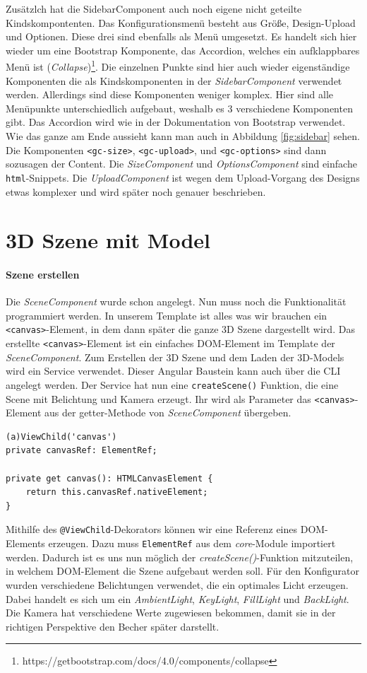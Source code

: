Zusätzlch hat die SidebarComponent auch noch eigene nicht geteilte Kindskompontenten. Das Konfigurationsmenü besteht aus Größe, Design-Upload und Optionen. Diese drei sind ebenfalls als Menü umgesetzt. Es handelt sich hier wieder um eine Bootstrap Komponente, das Accordion, welches ein aufklappbares Menü ist (\textit{Collapse})\footnote{https://getbootstrap.com/docs/4.0/components/collapse}. Die einzelnen Punkte sind hier auch wieder eigenständige Komponenten die als Kindskomponenten in der \textit{SidebarComponent} verwendet werden. Allerdings sind diese Komponenten weniger komplex. Hier sind alle Menüpunkte unterschiedlich aufgebaut, weshalb es 3 verschiedene Komponenten gibt. Das Accordion wird wie in der Dokumentation von Bootstrap verwendet. Wie das ganze am Ende aussieht kann man auch in Abbildung \ref{fig:sidebar} sehen. Die Komponenten \texttt{<gc-size>}, \texttt{<gc-upload>}, und \texttt{<gc-options>} sind dann sozusagen der Content. Die \textit{SizeComponent} und \textit{OptionsComponent} sind einfache \texttt{html}-Snippets. Die \textit{UploadComponent} ist wegen dem Upload-Vorgang des Designs etwas komplexer und wird später noch genauer beschrieben.
%
\section{3D Szene mit Model}
\label{sec:umsetzung}
%
\paragraph{Szene erstellen}Die \textit{SceneComponent} wurde schon angelegt. Nun muss noch die Funktionalität programmiert werden. In unserem Template ist alles was wir brauchen ein \texttt{<canvas>}-Element, in dem dann später die ganze 3D Szene dargestellt wird. Das erstellte \texttt{<canvas>}-Element ist ein einfaches DOM-Element im Template der \textit{SceneComponent}. Zum Erstellen der 3D Szene und dem Laden der 3D-Models wird ein Service verwendet. Dieser Angular Baustein kann auch über die CLI angelegt werden. Der Service hat nun eine \texttt{createScene()} Funktion, die eine Scene mit Belichtung und Kamera erzeugt. Ihr wird als Parameter das \texttt{<canvas>}-Element aus der getter-Methode von \textit{SceneComponent} übergeben. 
%
\begin{lstlisting}[caption={Erstellung eines ElementRef für Canvas},label=lst:elementref]
(a)ViewChild('canvas')
private canvasRef: ElementRef;

private get canvas(): HTMLCanvasElement {
	return this.canvasRef.nativeElement;
}
\end{lstlisting}
%
Mithilfe des \texttt{@ViewChild}-Dekorators können wir eine Referenz eines DOM-Elements erzeugen. Dazu muss \texttt{ElementRef} aus dem \textit{core}-Module importiert werden.  Dadurch ist es uns nun möglich der \textit{createScene()}-Funktion mitzuteilen, in welchem DOM-Element die Szene aufgebaut werden soll. Für den Konfigurator wurden verschiedene Belichtungen verwendet, die ein optimales Licht erzeugen. Dabei handelt es sich um ein \textit{AmbientLight}, \textit{KeyLight}, \textit{FillLight} und \textit{BackLight}. Die Kamera hat verschiedene Werte zugewiesen bekommen, damit sie in der richtigen Perspektive den Becher später darstellt.
%
